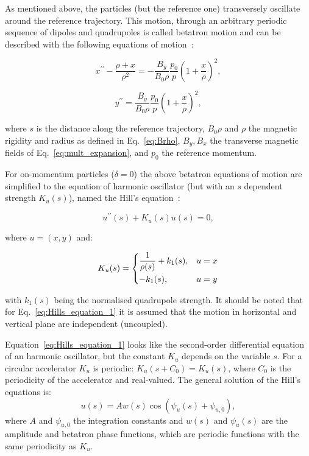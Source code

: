 As mentioned above, the particles (but the reference one) transversely  oscillate around the reference trajectory. This motion, through an arbitrary periodic sequence of dipoles and quadrupoles is called betatron motion and can be described with the following equations of motion~\cite{Lee:1425444}:

\begin{equation}\label{eq:transverse_eq_x}
    x^{\prime \prime} - \frac{\rho+x}{\rho^2} = - \frac{B_y}{B_0 \rho} \frac{p_0}{p} \left (  1+ \frac{x}{\rho} \right )^2, 
\end{equation}

\begin{equation}\label{eq:transverse_eq_y}
    y^{\prime \prime} = \frac{B_y}{B_0 \rho} \frac{p_0}{p}  \left (  1+ \frac{x}{\rho} \right )^2, 
\end{equation}

where $s$ is the distance along the reference trajectory, $B_0 \rho$ and $\rho$ the magnetic rigidity and radius as defined in Eq.~\eqref{eq:Brho},  $B_y, B_x$ the transverse magnetic fields of Eq.~\eqref{eq:mult_expansion}, and $p_0$ the reference momentum.

For on-momentum particles ($\delta = 0$) the above betatron equations of motion are simplified to the equation of harmonic oscillator (but with an $s$ dependent strength $K_u(s)$), named the Hill's equation~\cite{Lee:1425444}:

\begin{equation}\label{eq:Hills_equation_1}
    u^{\prime \prime}(s) + K_u(s) u(s) = 0,
\end{equation}

where $u=(x,y)$ and:

 \begin{equation}\label{eq:Hills_equation_2}
    K_u(s) = \begin{dcases}
        \frac{1}{\rho(s)}+k_1(s), & u=x \\
        -k_1(s), & u=y 
    \end{dcases}
\end{equation}

with $k_1(s)$ being the normalised quadrupole strength. It should be noted that for Eq.~\eqref{eq:Hills_equation_1} it is assumed that the motion in horizontal and vertical plane are independent (uncoupled).

Equation~\eqref{eq:Hills_equation_1} looks like the second-order differential equation of an harmonic oscillator, but the constant $K_u$ depends on the variable $s$. For a circular accelerator $K_u$ is periodic: $K_u(s+C_0)=K_u(s)$, where $C_0$ is the periodicity of the accelerator and real-valued. The general solution of the Hill's equations is:
\begin{equation}\label{eq:Hills_solution}
    u(s) = A w(s) \cos{(\psi_u(s)+\psi_{u,0})},
\end{equation}
where $A$ and $\psi_{u,0}$ the integration constants and $w(s)$ and $\psi_u(s)$ are the amplitude and betatron phase functions, which are periodic functions with the same periodicity as $K_u$.


